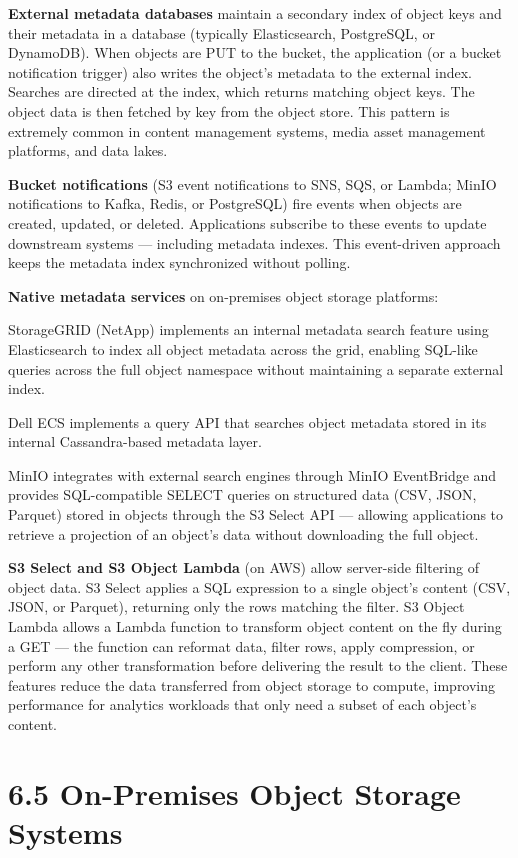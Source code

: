\textbf{External metadata databases} maintain a secondary index of object keys and their metadata in a database (typically Elasticsearch, PostgreSQL, or DynamoDB). When objects are PUT to the bucket, the application (or a bucket notification trigger) also writes the object's metadata to the external index. Searches are directed at the index, which returns matching object keys. The object data is then fetched by key from the object store. This pattern is extremely common in content management systems, media asset management platforms, and data lakes.

\textbf{Bucket notifications} (S3 event notifications to SNS, SQS, or Lambda; MinIO notifications to Kafka, Redis, or PostgreSQL) fire events when objects are created, updated, or deleted. Applications subscribe to these events to update downstream systems --- including metadata indexes. This event-driven approach keeps the metadata index synchronized without polling.

\textbf{Native metadata services} on on-premises object storage platforms:

StorageGRID (NetApp) implements an internal metadata search feature using Elasticsearch to index all object metadata across the grid, enabling SQL-like queries across the full object namespace without maintaining a separate external index.

Dell ECS implements a query API that searches object metadata stored in its internal Cassandra-based metadata layer.

MinIO integrates with external search engines through MinIO EventBridge and provides SQL-compatible SELECT queries on structured data (CSV, JSON, Parquet) stored in objects through the S3 Select API --- allowing applications to retrieve a projection of an object's data without downloading the full object.

\textbf{S3 Select and S3 Object Lambda} (on AWS) allow server-side filtering of object data. S3 Select applies a SQL expression to a single object's content (CSV, JSON, or Parquet), returning only the rows matching the filter. S3 Object Lambda allows a Lambda function to transform object content on the fly during a GET --- the function can reformat data, filter rows, apply compression, or perform any other transformation before delivering the result to the client. These features reduce the data transferred from object storage to compute, improving performance for analytics workloads that only need a subset of each object's content.

\section{6.5 On-Premises Object Storage Systems}
